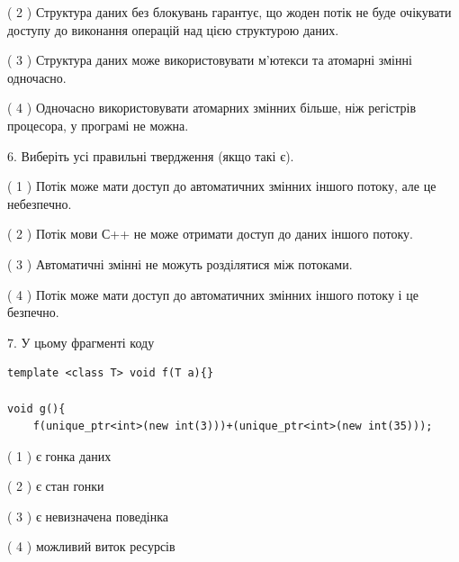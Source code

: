 \documentclass[12pt, ukrainian]{article}
\begin{document}
\begin {large}
{( 2 ) Структура даних без блокувань гарантує, що жоден потік не буде очікувати доступу до виконання операцій над цією структурою даних.%

( 3 ) Структура даних може використовувати м’ютекси та атомарні змінні одночасно.%

( 4 ) Одночасно використовувати атомарних змінних більше, ніж регістрів процесора, у програмі не можна.%
\newpage



\vspace{5mm}
6. Виберіть усі правильні твердження (якщо такі є).\par
\vspace{2mm}

( 1 ) Потік може мати доступ до автоматичних змінних іншого потоку, але це небезпечно.%

( 2 ) Потік мови С++ не може отримати доступ до даних іншого потоку.%

( 3 ) Автоматичні змінні не можуть розділятися між потоками.%

( 4 ) Потік може мати доступ до автоматичних змінних іншого потоку і це безпечно.%


\vspace{5mm}
7. У цьому фрагменті коду
\begin{verbatim}
template <class T> void f(T a){}

void g(){
    f(unique_ptr<int>(new int(3)))+(unique_ptr<int>(new int(35)));
\end{verbatim}

( 1 ) є гонка даних%

( 2 ) є стан гонки%

( 3 ) є невизначена поведінка%

( 4 ) можливий виток ресурсів%
}
\end {large}
\end{document}
